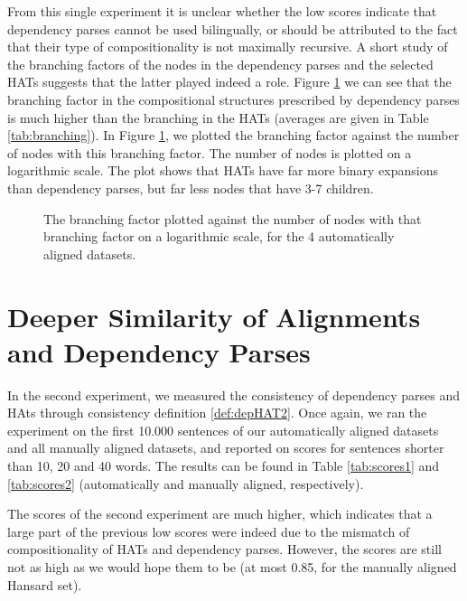 From this single experiment it is unclear whether the low scores indicate that dependency parses cannot be used bilingually, or should be attributed to the fact that their type of compositionality is not maximally recursive. A short study of the branching factors of the nodes in the dependency parses and the selected HATs suggests that the latter played indeed a role. Figure \ref{fig:branching} we can see that the branching factor in the compositional structures prescribed by dependency parses is much higher than the branching in the HATs (averages are given in Table \ref{tab:branching}). In Figure \ref{fig:branching}, we plotted the branching factor against the number of nodes with this branching factor. The number of nodes is plotted on a logarithmic scale. The plot shows that HATs have far more binary expansions than dependency parses, but far less nodes that have 3-7 children. 

\begin{figure}[!ht]

\caption{The branching factor plotted against the number of nodes with that branching factor on a logarithmic scale, for the 4 automatically aligned datasets.}\label{fig:branching}
\end{figure}


\section{Deeper Similarity of Alignments and Dependency Parses}
\label{sec:exp2}

In the second experiment, we measured the consistency of dependency parses and HAts through consistency definition \ref{def:depHAT2}. Once again, we ran the experiment on the first 10.000 sentences of our automatically aligned datasets and all manually aligned datasets, and reported on scores for sentences shorter than 10, 20 and 40 words. The results can be found in Table \ref{tab:scores1} and \ref{tab:scores2} (automatically and manually aligned, respectively).

The scores of the second experiment are much higher, which indicates that a large part of the previous low scores were indeed due to the mismatch of compositionality of HATs and dependency parses. However, the scores are still not as high as we would hope them to be (at most 0.85, for the manually aligned Hansard set).

